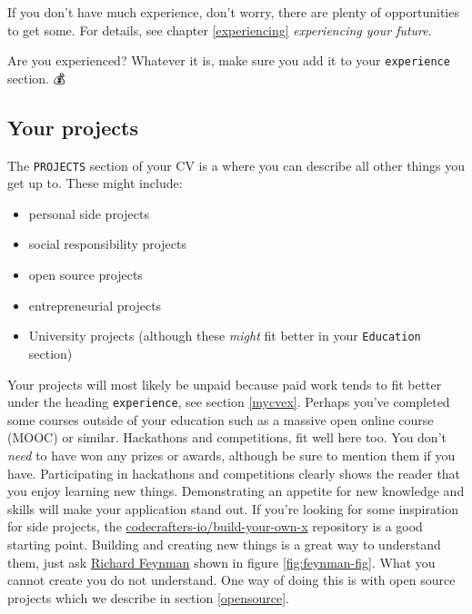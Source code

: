 \documentclass[
]{book}
\providecommand{\tightlist}{%
  \setlength{\itemsep}{0pt}\setlength{\parskip}{0pt}}
\begin{document}
If you don't have much experience, don't worry, there are plenty of opportunities to get some. For details, see chapter \ref{experiencing} \emph{experiencing your future}.

Are you experienced? Whatever it is, make sure you add it to your \texttt{experience} section. 💰

\hypertarget{mycvpj}{%
\subsection{Your projects}\label{mycvpj}}

The \texttt{PROJECTS} section of your CV is a where you can describe all other things you get up to. These might include:

\begin{itemize}
\tightlist
\item
  personal side projects
\item
  social responsibility projects
\item
  open source projects
\item
  entrepreneurial projects
\item
  University projects (although these \emph{might} fit better in your \texttt{Education} section)
\end{itemize}

Your projects will most likely be unpaid because paid work tends to fit better under the heading \texttt{experience}, see section \ref{mycvex}. Perhaps you've completed some courses outside of your education such as a massive open online course (MOOC) or similar. Hackathons and competitions, fit well here too. \citep{hafb} You don't \emph{need} to have won any prizes or awards, although be sure to mention them if you have. Participating in hackathons and competitions clearly shows the reader that you enjoy learning new things. Demonstrating an appetite for new knowledge and skills will make your application stand out. If you're looking for some inspiration for side projects, the \href{https://github.com/codecrafters-io/build-your-own-x}{codecrafters-io/build-your-own-x} repository is a good starting point. Building and creating new things is a great way to understand them, just ask \href{https://en.wikipedia.org/wiki/Richard_Feynman}{Richard Feynman} shown in figure \ref{fig:feynman-fig}. What you cannot create you do not understand. One way of doing this is with open source projects which we describe in section \ref{opensource}.
\end{document}
